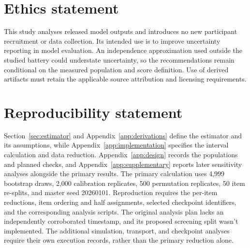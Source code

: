 \documentclass{article}
\begin{document}
\section*{Ethics statement}
This study analyses released model outputs and introduces no new participant recruitment or data collection. Its intended use is to improve uncertainty reporting in model evaluation. An independence approximation used outside the studied battery could understate uncertainty, so the recommendations remain conditional on the measured population and score definition. Use of derived artifacts must retain the applicable source attribution and licensing requirements.

\section*{Reproducibility statement}
Section~\ref{sec:estimator} and Appendix~\ref{app:derivations} define the estimator and its assumptions, while Appendix~\ref{app:implementation} specifies the interval calculation and data reduction. Appendix~\ref{app:design} records the populations and planned checks, and Appendix~\ref{app:supplementary} reports later sensitivity analyses alongside the primary results. The primary calculation uses 4,999 bootstrap draws, 2,000 calibration replicates, 500 permutation replicates, 50 item re-splits, and master seed 20260101. Reproduction requires the per-item reductions, item ordering and half assignments, selected checkpoint identifiers, and the corresponding analysis scripts. The original analysis plan lacks an independently corroborated timestamp, and its proposed screening split wasn't implemented. The additional simulation, transport, and checkpoint analyses require their own execution records, rather than the primary reduction alone.


\clearpage
\appendix


\end{document}

